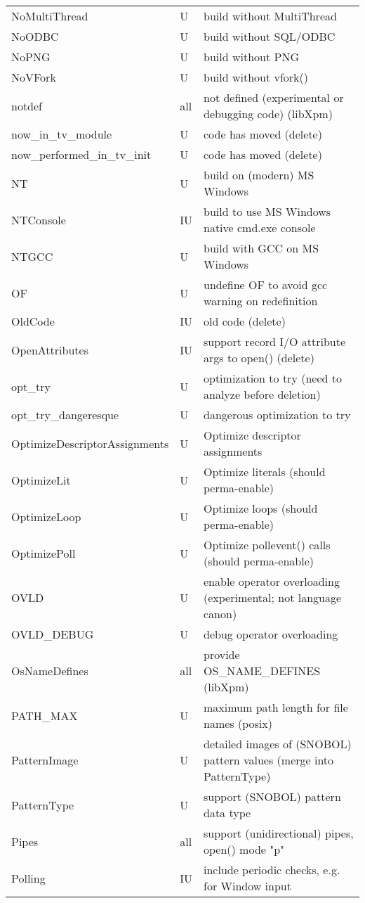 \begin{xtabular}{|m{1.8in}|m{0.5in}|m{4.0in}|}
NoMultiThread & U & build without MultiThread \\
NoODBC & U & build without SQL/ODBC \\
NoPNG & U & build without PNG \\
NoVFork & U & build without vfork() \\
notdef & all & not defined (experimental or debugging code) (libXpm) \\
now\_in\_tv\_module & U & code has moved (delete) \\
now\_performed\_in\_tv\_init & U & code has moved (delete) \\
NT & U & build on (modern) MS Windows \\
NTConsole & IU & build to use MS Windows native cmd.exe console \\
NTGCC & U & build with GCC on MS Windows \\
OF & U & undefine OF to avoid gcc warning on redefinition \\
OldCode & IU & old code (delete) \\
OpenAttributes & IU & support record I/O attribute args to open() (delete) \\
opt\_try & U & optimization to try (need to analyze before deletion) \\
opt\_try\_dangeresque & U & dangerous optimization to try  \\
OptimizeDescriptorAssignments & U & Optimize descriptor assignments \\
OptimizeLit & U & Optimize literals (should perma-enable) \\
OptimizeLoop & U & Optimize loops (should perma-enable) \\
OptimizePoll & U & Optimize pollevent() calls (should perma-enable) \\
OVLD & U & enable operator overloading (experimental; not language canon) \\
OVLD\_DEBUG & U & debug operator overloading \\
OsNameDefines & all & provide OS\_NAME\_DEFINES (libXpm) \\
PATH\_MAX & U & maximum path length for file names (posix) \\
PatternImage & U & detailed images of (SNOBOL) pattern values (merge into PatternType) \\
PatternType & U & support (SNOBOL) pattern data type \\
Pipes & all & support (unidirectional) pipes, open() mode "p" \\
Polling & IU & include periodic checks, e.g. for Window input \\

\end{xtabular}
